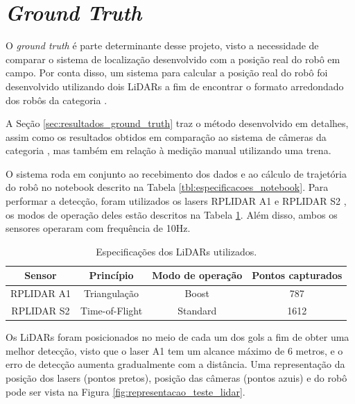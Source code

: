 \documentclass[acronym, symbols, table, deposito]{fei}
\begin{document}
	\section{\textit{Ground Truth}}\label{sec:metodologia_ground_truth}
	
	O \textit{ground truth} é parte determinante desse projeto, visto a necessidade de comparar o sistema de localização desenvolvido com a posição real do robô em campo. Por conta disso, um sistema para calcular a posição real do robô foi desenvolvido utilizando dois LiDARs a fim de encontrar o formato arredondado dos robôs da categoria .
	
	A Seção \ref{sec:resultados_ground_truth} traz o método desenvolvido em detalhes, assim como os resultados obtidos em comparação ao sistema de câmeras da categoria , mas também em relação à medição manual utilizando uma trena.
	
	O sistema roda em conjunto ao recebimento dos dados e ao cálculo de trajetória do robô no notebook descrito na Tabela \ref{tbl:especificacoes_notebook}. Para performar a detecção, foram utilizados os lasers RPLIDAR A1 \cite{rplidar_a1} e RPLIDAR S2 \cite{rplidar_s2}, os modos de operação deles estão descritos na Tabela \ref{tbl:especificacoes_laser}. Além disso, ambos os sensores operaram com frequência de 10Hz.
	
	\begin{table}[!htb]
		\centering
		\caption{Especificações dos LiDARs utilizados.}
		\label{tbl:especificacoes_laser}
		\begin{tabular}{|c|c|c|c|}
			\hline
			Sensor 				& Princípio 		& Modo de operação 	& Pontos capturados\\ \hline
			RPLIDAR A1			& Triangulação 		& Boost 			& 787 \\ \hline
			RPLIDAR S2 			& Time-of-Flight 	& Standard		    & 1612 \\ \hline
		\end{tabular}
	\end{table}

	Os LiDARs foram posicionados no meio de cada um dos gols a fim de obter uma melhor detecção, visto que o laser A1 tem um alcance máximo de 6 metros, e o erro de detecção aumenta gradualmente com a distância. Uma representação da posição dos lasers (pontos pretos), posição das câmeras (pontos azuis) e do robô pode ser vista na Figura \ref{fig:representacao_teste_lidar}.
	
\end{document}
